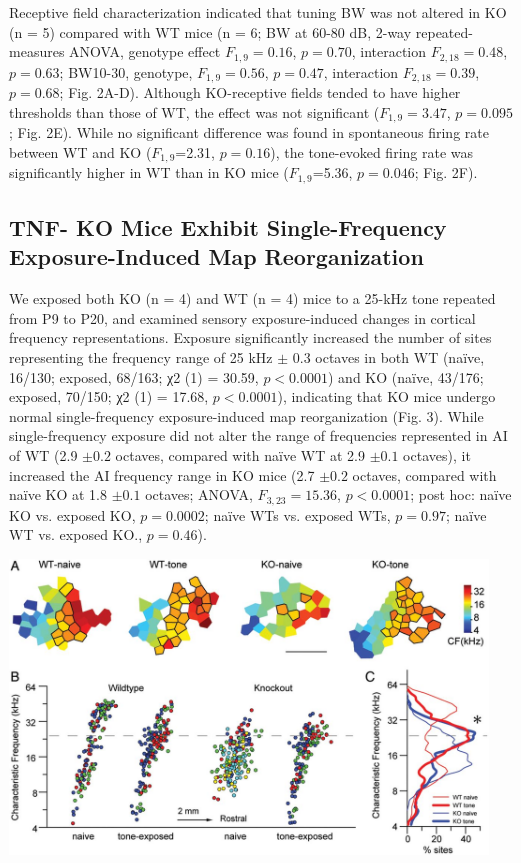Receptive field characterization indicated that tuning BW was not altered in KO (n = 5) compared with WT mice (n = 6; BW at 60-80 dB, 2-way repeated-measures ANOVA, genotype effect $F_{1,9}=0.16$, $p=0.70$, interaction $F_{2,18}=0.48$, $p=0.63$; BW10-30, genotype, $F_{1,9}=0.56$, $p=0.47$, interaction $F_{2,18}=0.39$, $p=0.68$; Fig. 2A-D). Although KO-receptive fields tended to have higher thresholds than those of WT, the effect was not significant ($F_{1,9}=3.47$, $p=0.095$; Fig. 2E). While no significant difference was found in spontaneous firing rate between WT and KO ($F_{1,9}$=2.31, $p=0.16$), the tone-evoked firing rate was significantly higher in WT than in KO mice ($F_{1,9}$=5.36, $p=0.046$; Fig. 2F).

\subsection{TNF-\textalpha{} KO Mice Exhibit Single-Frequency Exposure-Induced Map Reorganization}

We exposed both KO (n = 4) and WT (n = 4) mice to a 25-kHz tone repeated from P9 to P20, and examined sensory exposure-induced changes in cortical frequency representations. Exposure significantly increased the number of sites representing the frequency range of 25 kHz $\pm$ 0.3 octaves in both WT (na\"ive, 16/130; exposed, 68/163; χ2 (1) = 30.59, $p<0.0001$) and KO (na\"ive, 43/176; exposed, 70/150; χ2 (1) = 17.68, $p<0.0001$), indicating that KO mice undergo normal single-frequency exposure-induced map reorganization (Fig. 3). While single-frequency exposure did not alter the range of frequencies represented in AI of WT (2.9 $\pm0.2$ octaves, compared with na\"ive WT at 2.9 $\pm0.1$ octaves), it increased the AI frequency range in KO mice (2.7 $\pm0.2$ octaves, compared with na\"ive KO at 1.8 $\pm0.1$ octaves; ANOVA, $F_{3,23}=15.36$, $p<0.0001$; post hoc: na\"ive KO vs. exposed KO, $p=0.0002$; na\"ive WTs vs. exposed WTs, $p=0.97$; na\"ive WT vs. exposed KO., $p=0.46$).

\newpage

\centerline{\includegraphics[width=5in]{images/C3F3}}

